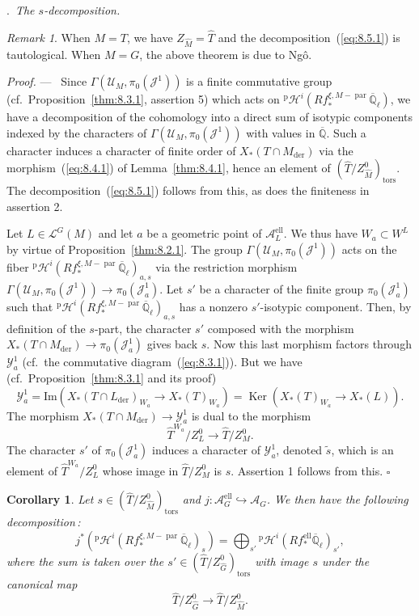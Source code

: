 \documentclass[12pt,a4paper,oneside,english,leqno]{smfart}
\makeatletter
\numberwithin{equation}{subsection}
\newcounter{theo}
\numberwithin{theo}{subsection}
\newenvironment{paragr}[1][]{\medskip\refstepcounter{subsection}%
  \par\noindent\hspace*{\parindent}\thesubsection.\ \emph{#1}%
  \@ifundefined{@empty}{}{}\ignorespaces}{\medskip}
\theoremstyle{plain}
\newtheorem{corollary}[theo]{Corollary}
\theoremstyle{definition}
\theoremstyle{remark}
\newtheorem{remark}[theo]{Remark}
\newenvironment{preuve}[1][]{\medskip\noindent\textit{Proof.} #1 ---\ }%
  {\hfill\ensuremath{\square}\medskip}
\DeclareMathOperator{\der}{der}
\DeclareMathOperator{\el}{ell}
\DeclareMathOperator{\Ker}{Ker}
\DeclareMathOperator{\tors}{tors}
\DeclareMathOperator{\parab}{par}
\newcommand{\Qlb}{\overline{\mathbb{Q}}_{\ell}}
\newcommand{\Qb}{\overline{\mathbb{Q}}}
\newcommand{\uc}{\mathcal{U}}
\newcommand{\yc}{\mathcal{Y}}
\newcommand{\lc}{\mathcal{L}}
\newcommand{\hc}{\mathcal{H}}
\newcommand{\Ac}{\mathcal{A}}
\newcommand{\Jc}{\mathcal{J}}
\newcommand{\Gc}{\widehat{G}}
\newcommand{\Tc}{\widehat{T}}
\newcommand{\Mc}{\widehat{M}}
\makeatother
\begin{document}
\begin{paragr}[The $s$-decomposition.]
\begin{remark}\label{thm:8.5.2}
When $M=T$, we have $Z_{\Mc}=\Tc$ and the decomposition~(\ref{eq:8.5.1}) is tautological. When $M=G$, the above theorem is due to Ngô.
\end{remark}

\begin{preuve}
Since $\Gamma(\uc_M,\pi_0(\Jc^1))$ is a finite commutative group (cf.\ Proposition~\ref{thm:8.3.1}, assertion 5) which acts on ${}^{\mathrm{p}}\hc^i(Rf_*^{\xi,M-\parab}\Qlb)$, we have a decomposition of the cohomology into a direct sum of isotypic components indexed by the characters of $\Gamma(\uc_M,\pi_0(\Jc^1))$ with values in $\Qb$. Such a character induces a character of finite order of $X_*(T\cap M_{\der})$ via the morphism~(\ref{eq:8.4.1}) of Lemma~\ref{thm:8.4.1}, hence an element of $(\Tc/Z^0_{\Mc})_{\tors}$. The decomposition~(\ref{eq:8.5.1}) follows from this, as does the finiteness in assertion 2.

Let $L\in\lc^G(M)$ and let $a$ be a geometric point of $\Ac_L^{\el}$. We thus have $W_a\subset W^L$ by virtue of Proposition~\ref{thm:8.2.1}. The group $\Gamma(\uc_M,\pi_0(\Jc^1))$ acts on the fiber ${}^{\mathrm{p}}\hc^i(Rf_*^{\xi,M-\parab}\Qlb)_{a,s}$ via the restriction morphism $\Gamma(\uc_M,\pi_0(\Jc^1))\to\pi_0(\Jc^1_a)$. Let $s'$ be a character of the finite group $\pi_0(\Jc^1_a)$ such that ${}^{\mathrm{p}}\hc^i(Rf_*^{\xi,M-\parab}\Qlb)_{a,s}$ has a nonzero $s'$-isotypic component. Then, by definition of the $s$-part, the character $s'$ composed with the morphism $X_*(T\cap M_{\der})\to\pi_0(\Jc^1_a)$ gives back $s$. Now this last morphism factors through $\yc^1_a$ (cf.\ the commutative diagram~(\ref{eq:8.3.1})). But we have (cf.\ Proposition~\ref{thm:8.3.1} and its proof)
$$
\yc^1_a=\mathrm{Im}(X_*(T\cap L_{\der})_{W_a}\to X_*(T)_{W_a})=\Ker(X_*(T)_{W_a}\to X_*(L)).
$$
The morphism $X_*(T\cap M_{\der})\to\yc^1_a$ is dual to the morphism
$$
\Tc^{W_a}/Z^0_L\to\Tc/Z^0_M.
$$
The character $s'$ of $\pi_0(\Jc^1_a)$ induces a character of $\yc^1_a$, denoted $\tilde s$, which is an element of $\Tc^{W_a}/Z^0_L$ whose image in $\Tc/Z^0_M$ is $s$. Assertion 1 follows from this.
\end{preuve}

\begin{corollary}\label{thm:8.5.3}
Let $s\in(\Tc/Z^0_{\Mc})_{\tors}$ and $j:\Ac_G^{\el}\hookrightarrow\Ac_G$. We then have the following decomposition\,:
$$
j^*({}^{\mathrm{p}}\hc^i(Rf_*^{\xi,M-\parab}\Qlb)_s)=\bigoplus_{s'}{}^{\mathrm{p}}\hc^i(Rf_*^{\el}\Qlb)_{s'},
$$
where the sum is taken over the $s'\in(\Tc/Z^0_{\Gc})_{\tors}$ with image $s$ under the canonical map
$$
\Tc/Z^0_{\Gc}\to\Tc/Z^0_{\Mc}.
$$
\end{corollary}


\end{paragr}
\end{document}
